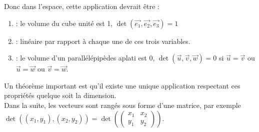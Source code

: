 \documentclass{book}
\begin{document}
Donc dans l'espace, cette application devrait être :
\begin{enumerate}
\item {} : le volume du cube unité est 1, $\det(\vec{e_1},\vec{e_2},\vec{e_3})=1$
\item {} : linéaire par rapport à chaque une de ces trois variables.
\item {} : le volume d'un parallélépipèdes aplati est 0,  $\det(\vec{u},\vec{v},\vec{w})=0$ si $\vec{u}=\vec{v}$ ou $\vec{u}=\vec{w}$ ou $\vec{v}=\vec{w}$.
\end{enumerate}
Un théorème important est qu'il existe une unique application respectant ces propriétés quelque soit la dimension.\\
Dans la suite, les vecteurs sont rangés sous forme d'une matrice, par exemple $\det((x_1,y_1),(x_2,y_2))=\det(\begin{pmatrix}
x_1 & x_2 \\
y_1 & y_2
\end{pmatrix}).$ 


 
\end{document}
